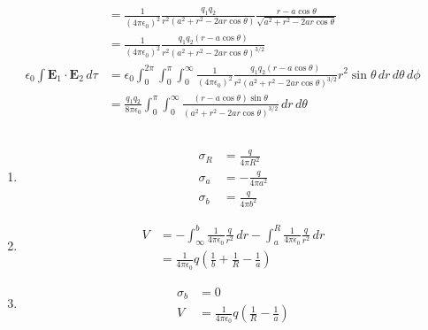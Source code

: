 \documentclass{article}
\renewcommand{\vec}[1]{\boldsymbol{\mathbf{#1}}}
\newcommand{\ke}{\frac{1}{4 \pi \epsilon_0}}
\begin{document}
\begin{align*}
                                                     & = \frac{1}{(4 \pi \epsilon_0)^2} \frac{q_1 q_2}{r^2 (a^2 + r^2 - 2 a r \cos \theta)} \frac{r - a \cos \theta}{\sqrt{a^2 + r^2 - 2 a r \cos \theta}}                                                           \\
                                                     & = \frac{1}{(4 \pi \epsilon_0)^2} \frac{q_1 q_2 (r - a \cos \theta)}{r^2 (a^2 + r^2 - 2 a r \cos \theta)^{3 / 2}}                                                                                              \\
  \epsilon_0 \int \vec{E}_1 \cdot \vec{E}_2 \,d \tau & = \epsilon_0 \int_0^{2 \pi} \int_0^\pi \int_0^\infty \frac{1}{(4 \pi \epsilon_0)^2} \frac{q_1 q_2 (r - a \cos \theta)}{r^2 (a^2 + r^2 - 2 a r \cos \theta)^{3 / 2}} r^2 \sin \theta \,d r \,d \theta \,d \phi \\
                                                     & = \frac{q_1 q_2}{8 \pi \epsilon_0} \int_0^\pi \int_0^\infty \frac{(r - a \cos \theta) \sin \theta}{(a^2 + r^2 - 2 a r \cos \theta)^{3 / 2}} \,d r \,d \theta
\end{align*}

\subsection{}

\begin{enumerate}
  \item

        \begin{align*}
          \sigma_R & = \frac{q}{4 \pi R^2}  \\
          \sigma_a & = -\frac{q}{4 \pi a^2} \\
          \sigma_b & = \frac{q}{4 \pi b^2}
        \end{align*}

  \item

        \begin{align*}
          V & = -\int_\infty^b \ke \frac{q}{r^2} \,d r - \int_a^R \ke \frac{q}{r^2} \,d r \\
            & = \ke q \left( \frac{1}{b} + \frac{1}{R} - \frac{1}{a} \right)
        \end{align*}

  \item

        \begin{align*}
          \sigma_b & = 0                                              \\
          V        & = \ke q \left( \frac{1}{R} - \frac{1}{a} \right)
        \end{align*}
\end{enumerate}
\end{document}
